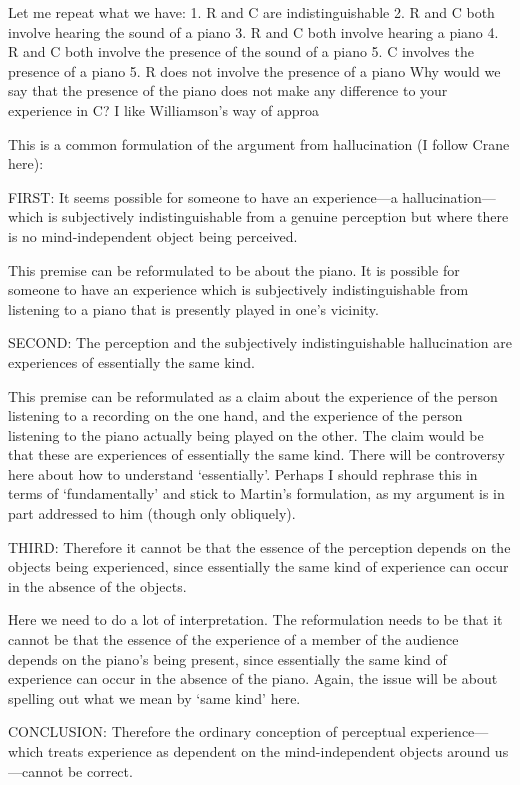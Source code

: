 \documentclass[sloppy, journal, git, bytitle, dodraft]{humapap}
\begin{document}
Let me repeat what we have:
1. R and C are indistinguishable
2. R and C both involve hearing the sound of a piano
3. R and C both involve hearing a piano
4. R and C both involve the presence of the sound of a piano
5. C involves the presence of a piano
5. R does not involve the presence of a piano
Why would we say that the presence of the piano does not make any difference to your experience in C? I like Williamson's way of approa


This is a common formulation of the argument from hallucination (I follow Crane here): 

FIRST: It seems possible for someone to have an experience—a hallucination—which is subjectively indistinguishable from a genuine perception but where there is no mind-independent object being perceived.

This premise can be reformulated to be about the piano. It is possible for someone to have an experience which is subjectively indistinguishable from listening to a piano that is presently played in one's vicinity. 

SECOND: The perception and the subjectively indistinguishable hallucination are experiences of essentially the same kind.

This premise can be reformulated as a claim about the experience of the person listening to a recording on the one hand, and the experience of the person listening to the piano actually being played on the other. The claim would be that these are experiences of essentially the same kind. There will be controversy here about how to understand `essentially'. Perhaps I should rephrase this in terms of `fundamentally' and stick to Martin's formulation, as my argument is in part addressed to him (though only obliquely).

THIRD: Therefore it cannot be that the essence of the perception depends on the objects being experienced, since essentially the same kind of experience can occur in the absence of the objects.

Here we need to do a lot of interpretation. The reformulation needs to be that it cannot be that the essence of the experience of a member of the audience depends on the piano's being present, since essentially the same kind of experience can occur in the absence of the piano. Again, the issue will be about spelling out what we mean by `same kind' here.

CONCLUSION: Therefore the ordinary conception of perceptual experience—which treats experience as dependent on the mind-independent objects around us—cannot be correct.
\end{document}
